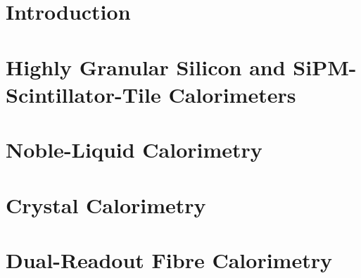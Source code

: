 \section{Introduction}

\label{sec:intro}


\section{Highly Granular Silicon and SiPM-Scintillator-Tile Calorimeters }
\label{sec:HG-Si-Scint}


\section{Noble-Liquid Calorimetry}
\label{sec:noble-liquid-calo}


\section{Crystal Calorimetry}
\label{sec:crystals}


\section{Dual-Readout Fibre Calorimetry}
\label{sec:dual-readout}


